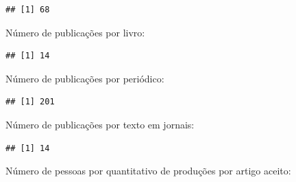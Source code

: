 \documentclass[]{article}
\newenvironment{Shaded}{\begin{snugshade}}{\end{snugshade}}
\newcommand{\ControlFlowTok}[1]{\textcolor[rgb]{0.13,0.29,0.53}{\textbf{#1}}}
\newcommand{\KeywordTok}[1]{\textcolor[rgb]{0.13,0.29,0.53}{\textbf{#1}}}
\newcommand{\NormalTok}[1]{#1}
\newcommand{\OperatorTok}[1]{\textcolor[rgb]{0.81,0.36,0.00}{\textbf{#1}}}
\begin{document}
\begin{verbatim}
## [1] 68
\end{verbatim}

Número de publicações por livro:

\begin{Shaded}
\end{Shaded}

\begin{verbatim}
## [1] 14
\end{verbatim}

Número de publicações por periódico:

\begin{Shaded}
\end{Shaded}

\begin{verbatim}
## [1] 201
\end{verbatim}

Número de publicações por texto em jornais:

\begin{Shaded}
\end{Shaded}

\begin{verbatim}
## [1] 14
\end{verbatim}

Número de pessoas por quantitativo de produções por artigo aceito:
\end{document}
